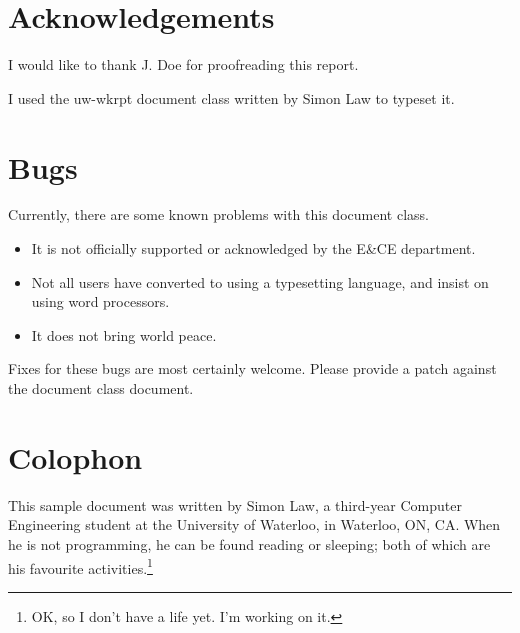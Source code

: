 \documentclass{uw-wkrpt}
\begin{document}
\section{Acknowledgements}
I would like to thank J. Doe for proofreading this report.

I used the \textsf{uw-wkrpt} document class written by Simon Law to 
typeset it.

\appendix

\section{Bugs}\label{app:bugs}
Currently, there are some known problems with this document class.
\begin{itemize}
  \item It is not officially supported or acknowledged by the
        E\&CE department.
  \item Not all users have converted to using a typesetting language, and
        insist on using word processors.
  \item It does not bring world peace.
\end{itemize}

Fixes for these bugs are most certainly welcome.  Please provide a patch
against the document class document.

\section{Colophon}\label{app:colophon}
This sample document was written by Simon Law, a third-year Computer
Engineering student at the University of Waterloo, in Waterloo, ON, CA.
When he is not programming, he can be found reading or sleeping;
both of which are his favourite activities.\footnote{OK, so I don't
have a life yet.  I'm working on it.}
\end{document}

